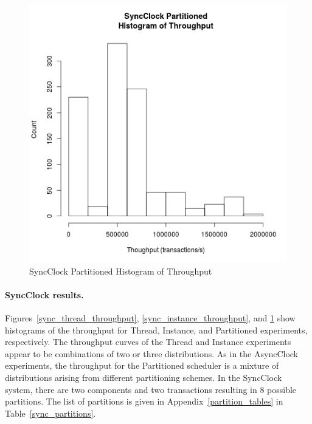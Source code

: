 \begin{figure}[H]
\center
\includegraphics[height=.4\textheight]{sync_partitioned_throughput_hist.png}
\caption{SyncClock Partitioned Histogram of Throughput}
\label{sync_partitioned_throughput}
\end{figure}

\paragraph{SyncClock results.}
Figures~\ref{sync_thread_throughput}, \ref{sync_instance_throughput}, and \ref{sync_partitioned_throughput} show histograms of the throughput for Thread, Instance, and Partitioned experiments, respectively.
The throughput curves of the Thread and Instance experiments appear to be combinations of two or three distributions.
As in the AsyncClock experiments, the throughput for the Partitioned scheduler is a mixture of distributions arising from different partitioning schemes.
In the SyncClock system, there are two components and two transactions resulting in 8 possible partitions.
The list of partitions is given in Appendix~\ref{partition_tables} in Table~\ref{sync_partitions}.


